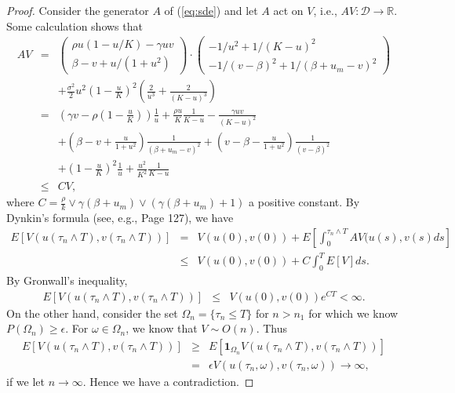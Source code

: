 \documentclass{aims}
\theoremstyle{definition}
\begin{document}
\begin{proof}
 Consider the generator $A$ of (\ref{eq:sde}) and let $A$ act on $V$, i.e., $AV:\mathcal{D}\to\mathbb{R}$.
 Some calculation shows that 
 \begin{eqnarray*}
 AV & = & \begin{pmatrix}\rho u(1-u/K)-\gamma uv\\
 \beta-v+u/(1+u^{2})
 \end{pmatrix}\cdot\begin{pmatrix}-1/u^{2}+1/(K-u)^{2}\\
 -1/(v-\beta)^{2}+1/(\beta+u_{m}-v)^{2}
 \end{pmatrix}\\
  &  & +\frac{\sigma^2}{2}u^{2}(1-\frac{u}{K})^{2}(\frac{2}{u^{3}}+\frac{2}{(K-u)^{3}})\\
  & = & (\gamma v-\rho(1-\frac{u}{K}))\frac{1}{u}+\frac{\rho u}{K}\frac{1}{K-u}-\frac{\gamma uv}{(K-u)^{2}}\\
  &  & +(\beta-v+\frac{u}{1+u^{2}})\frac{1}{(\beta+u_{m}-v)^{2}}+(v-\beta-\frac{u}{1+u^{2}})\frac{1}{(v-\beta)^{2}}\\
  &  & +(1-\frac{u}{K})^{2}\frac{1}{u}+\frac{u^{2}}{K^{2}}\frac{1}{K-u}\\
  & \le & CV,
 \end{eqnarray*}
 where $C=\frac{\rho}{k} \lor \gamma(\beta+u_m) \lor (\gamma(\beta+u_m)+1)$ a positive constant. By Dynkin's
 formula (see, e.g., \cite{OksendalSDEBook} Page 127), we have 
 \begin{eqnarray*}
 E[V(u(\tau_{n}\land T),v(\tau_{n}\land T))] & = & V(u(0),v(0))+E[\int_{0}^{\tau_{n}\land T}AV(u(s),v(s)ds]\\
  & \le & V(u(0),v(0))+C\int_{0}^{T}E[V]ds.
 \end{eqnarray*}
 By Gronwall's inequality, 
 \begin{eqnarray*}
 E[V(u(\tau_{n}\land T),v(\tau_{n}\land T))] & \le & V(u(0),v(0))e^{CT}<\infty.
 \end{eqnarray*}
 On the other hand, consider the set $\Omega_{n}=\{\tau_{n}\le T\}$
 for $n>n_{1}$ for which we know $P(\Omega_{n})\ge\epsilon$. For
 $\omega\in\Omega_{n}$, we know that $V\sim O(n)$. Thus 
 \begin{eqnarray*}
 E[V(u(\tau_{n}\land T),v(\tau_{n}\land T))] & \ge & E[\boldsymbol{1}_{\Omega_{n}}V(u(\tau_{n}\land T),v(\tau_{n}\land T))]\\
  & = & \epsilon V(u(\tau_{n},\omega),v(\tau_{n},\omega))\to\infty,
 \end{eqnarray*}
 if we let $n\to\infty$. Hence we have a contradiction. 
 \end{proof}
\end{document}
